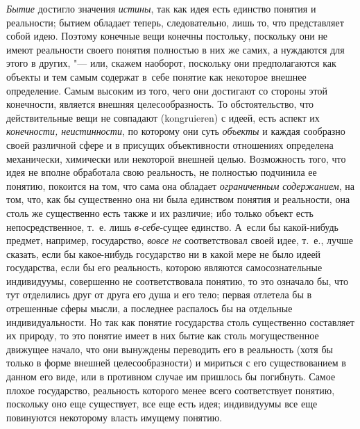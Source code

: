 {\em Бытие} достигло
значения {\em истины},
так как идея есть единство понятия и реальности; бытием
обладает теперь, следовательно, лишь то, что представляет собой идею.
Поэтому конечные вещи конечны постольку, поскольку они не имеют реальности
своего понятия полностью в них же самих, а нуждаются для этого в других, "---
или, скажем наоборот, поскольку они предполагаются как
объекты и тем самым содержат в~себе понятие как некоторое внешнее
определение. Самым высоким из того, чего они достигают со стороны этой
конечности, является внешняя целесообразность. То обстоятельство, что
действительные вещи не совпадают (kongruieren) с идеей, есть
аспект их {\em конечности,
неистинности}, по которому они суть
{\em объекты} и каждая
сообразно своей различной сфере и в присущих объективности отношениях
определена механически, химически или некоторой внешней целью. Возможность
того, что идея не вполне обработала свою реальность, не полностью подчинила
ее понятию, покоится на том, что сама она обладает
{\em ограниченным содержанием},
на том, что, как бы существенно она ни была единством понятия
и реальности, она столь же существенно есть также и их различие; ибо
только объект есть непосредственное, т.~е. лишь
{\em в-себе}{}-сущее
единство. А~если бы какой-нибудь предмет, например, государство,
{\em вовсе не}
соответствовал своей идее, т.~е., лучше сказать, если бы
какое-нибудь государство ни в какой мере не было идеей государства, если бы
его реальность, которою являются самосознательные индивидуумы, совершенно
не соответствовала понятию, то это означало бы, что тут отделились друг от
друга его душа и его тело; первая отлетела бы в отрешенные сферы мысли, а
последнее распалось бы на отдельные индивидуальности. Но так как понятие
государства столь существенно составляет их природу, то это понятие имеет в
них бытие как столь могущественное движущее начало, что они вынуждены
переводить его в реальность (хотя бы только в форме внешней
целесообразности) и мириться с его существованием в данном его виде, или в
противном случае им пришлось бы погибнуть. Самое плохое государство,
реальность которого менее всего соответствует понятию, поскольку оно еще
существует, все еще есть идея; индивидуумы все еще повинуются некоторому
власть имущему понятию.

